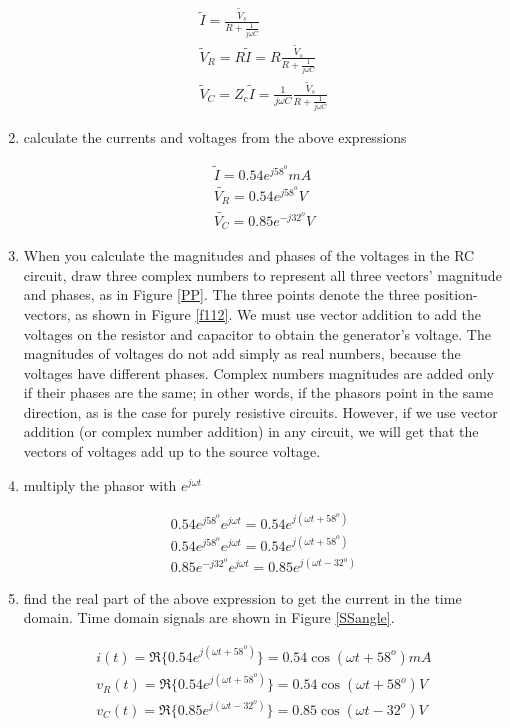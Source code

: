 \documentclass{ximera}
\begin{document}
\begin{example}
\begin{explanation}
\begin{enumerate}
\begin{eqnarray}
\tilde{I}  = \frac{\tilde{V}_s}{ R    + \frac{1}{j \omega C} } \\
\tilde{V}_R = R \tilde{I} = R \frac{\tilde{V}_s}{ R    + \frac{1}{j \omega C} }  \\
\tilde{V}_C = Z_c \tilde{I} =  \frac{1}{ j \omega C} \frac{\tilde{V}_s}{ R    + \frac{1}{j \omega C} }  
\end{eqnarray}

\item calculate the currents and voltages from the above expressions

\begin{eqnarray}
\tilde{I}  = 0.54 e^{j 58^o} \unit{mA} \\
\tilde{V_R} = 0.54  e^{j 58^o} \unit{V}\\
\tilde{V_C} =   0.85 e^{-j 32^o}  \unit{V}
\end{eqnarray}

\item When you calculate the magnitudes and phases of the voltages in the RC circuit, draw three complex numbers to represent all three vectors' magnitude and phases, as in Figure \ref{PP}. The three points denote the three position-vectors, as shown in Figure \ref{f112}. We must use vector addition to add the voltages on the resistor and capacitor to obtain the generator's voltage. The magnitudes of voltages do not add simply as real numbers, because the voltages have different phases. Complex numbers magnitudes are added only if their phases are the same; in other words, if the phasors point in the same direction, as is the case for purely resistive circuits. However, if we use vector addition (or complex number addition) in any circuit, we will get that the vectors of voltages add up to the source voltage.
\item multiply the phasor with $e^{j \omega t}$  

\begin{eqnarray}
0.54 e^{j 58^o} e^{j \omega t} = 0.54 e^{j(\omega t + 58^o)}\\
0.54  e^{j 58^o} e^{j \omega t} =0.54  e^{j( \omega t + 58^o)}\\
 0.85 e^{-j 32^o}e^{j \omega t} =0.85 e^{j(\omega t - 32^o)}
\end{eqnarray}
\item find the real part of the above expression to get the current in the time domain. Time domain signals are shown in Figure \ref{SSangle}.

\begin{eqnarray}
i(t)= \Re \{  0.54 e^{j(\omega t + 58^o)}  \} =0.54 \cos(\omega t + 58^o)  \unit{mA}  \\
v_R(t)= \Re \{ 0.54  e^{j( \omega t + 58^o)} \} = 0.54 \cos(\omega t + 58^o) \unit{V}   \\ 
v_C(t) =\Re \{ 0.85 e^{j(\omega t - 32^o)}    \} = 0.85 \cos(\omega t - 32^o) \unit{V}
\end{eqnarray}
\end{enumerate}
 

\end{explanation}
\end{example}
\end{document}

